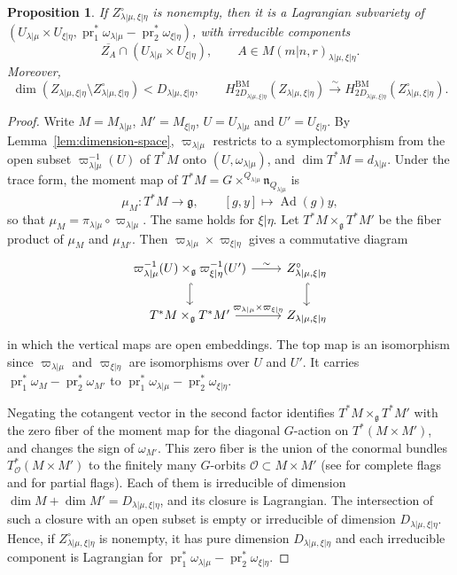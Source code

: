 \documentclass[11pt,a4paper]{amsart}
\newtheorem{proposition}[theorem]{Proposition}
\theoremstyle{definition}
\theoremstyle{remark}
\newcommand{\BM}{\mathrm{BM}}
\newcommand{\Ad}{\operatorname{Ad}}
\newcommand{\pr}{\operatorname{pr}}
\newcommand{\lm}{\lambda|\mu}
\newcommand{\xh}{\xi|\eta}
\newcommand{\Smat}{M(m|n,r)}
\numberwithin{equation}{section}
\begin{document}
\begin{proposition}\label{prop:lagrangian}
If $Z_{\lm,\xh}^{\circ}$ is nonempty, then it is a Lagrangian subvariety
of $(U_{\lm}\times U_{\xh},\pr_1^*\omega_{\lm}-\pr_2^*\omega_{\xh})$, with
irreducible components
$$
\overline{Z_A}\cap(U_{\lm}\times U_{\xh}),\qquad
A\in\Smat_{\lm,\xh}.
$$
Moreover,
\begin{equation}\label{eq:boundary}
\dim(Z_{\lm,\xh}\setminus Z_{\lm,\xh}^{\circ})<D_{\lm,\xh},\qquad
H^{\BM}_{2D_{\lm,\xh}}(Z_{\lm,\xh})\xrightarrow{\sim}
H^{\BM}_{2D_{\lm,\xh}}(Z_{\lm,\xh}^{\circ}).
\end{equation}
\end{proposition}
\begin{proof}
Write $M=M_{\lm}$, $M'=M_{\xh}$, $U=U_{\lm}$ and $U'=U_{\xh}$. By
Lemma~\ref{lem:dimension-space}, $\varpi_{\lm}$ restricts to a
symplectomorphism from the open subset $\varpi_{\lm}^{-1}(U)$ of $T^*M$
onto $(U,\omega_{\lm})$, and $\dim T^*M=d_{\lm}$. Under the trace form,
the moment map of $T^*M=G\times^{Q_{\lm}}\mathfrak n_{Q_{\lm}}$ is
$$
\mu_M:T^*M\longrightarrow\mathfrak g,\qquad [g,y]\longmapsto\Ad(g)y,
$$
so that $\mu_M=\pi_{\lm}\circ\varpi_{\lm}$. The same holds for $\xh$. Let
$T^*M\times_{\mathfrak g}T^*M'$ be the fiber product of $\mu_M$ and
$\mu_{M'}$. Then $\varpi_{\lm}\times\varpi_{\xh}$ gives a commutative diagram
$$
\begin{tikzcd}
\varpi_{\lm}^{-1}(U)\times_{\mathfrak g}\varpi_{\xh}^{-1}(U')
\arrow[r,"\sim"]\arrow[d,hook] & Z_{\lm,\xh}^{\circ}\arrow[d,hook]\\
T^*M\times_{\mathfrak g}T^*M'\arrow[r,"\varpi_{\lm}\times\varpi_{\xh}"]
& Z_{\lm,\xh}
\end{tikzcd}
$$
in which the vertical maps are open embeddings. The top map is an
isomorphism since $\varpi_{\lm}$ and $\varpi_{\xh}$ are isomorphisms over
$U$ and $U'$. It carries $\pr_1^*\omega_M-\pr_2^*\omega_{M'}$ to
$\pr_1^*\omega_{\lm}-\pr_2^*\omega_{\xh}$.

Negating the cotangent vector in the second factor identifies
$T^*M\times_{\mathfrak g}T^*M'$ with the zero fiber of the moment map for
the diagonal $G$-action on $T^*(M\times M')$, and changes the sign of
$\omega_{M'}$. This zero fiber is the union of the conormal bundles
$T^*_{\mathcal O}(M\times M')$ to the finitely many $G$-orbits
$\mathcal O\subset M\times M'$ (see \cite[Proposition~3.3.4]{CG} for
complete flags and \cite[Proposition~2.8]{LXY} for partial flags). Each
of them is irreducible of dimension $\dim M+\dim M'=D_{\lm,\xh}$, and its
closure is Lagrangian. The intersection of such a closure with an open
subset is empty or irreducible of dimension $D_{\lm,\xh}$. Hence, if
$Z_{\lm,\xh}^{\circ}$ is nonempty, it has pure dimension $D_{\lm,\xh}$
and each irreducible component is Lagrangian for
$\pr_1^*\omega_{\lm}-\pr_2^*\omega_{\xh}$.


\end{proof}
\end{document}
